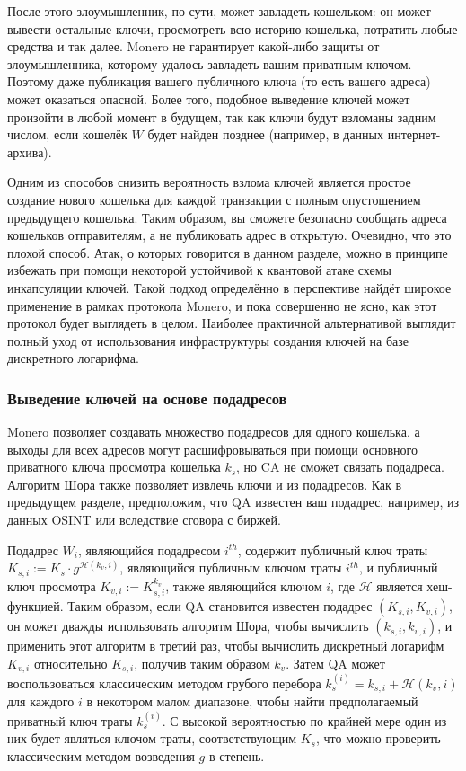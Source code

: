 \documentclass{mrl}
\begin{document}
После этого злоумышленник, по сути, может завладеть кошельком: он может вывести остальные ключи, просмотреть всю историю кошелька, потратить любые средства и так далее. Monero не гарантирует какой-либо защиты от злоумышленника, которому удалось завладеть вашим приватным ключом. Поэтому даже публикация вашего публичного ключа (то есть вашего адреса) может оказаться опасной. Более того, подобное выведение ключей может произойти в любой момент в будущем, так как ключи будут взломаны задним числом, если кошелёк $W$ будет найден позднее (например, в данных интернет-архива).

Одним из способов снизить вероятность взлома ключей является простое создание нового кошелька для каждой транзакции с полным опустошением предыдущего кошелька. Таким образом, вы сможете безопасно сообщать адреса кошельков отправителям, а не публиковать адрес в открытую. Очевидно, что это плохой способ. Атак, о которых говорится в данном разделе, можно в принципе избежать при помощи некоторой устойчивой к квантовой атаке схемы инкапсуляции ключей. Такой подход определённо в перспективе найдёт широкое применение в рамках протокола Monero, и пока совершенно не ясно, как этот протокол будет выглядеть в целом. Наиболее практичной альтернативой выглядит полный уход от использования инфраструктуры создания ключей на базе дискретного логарифма.

\subsubsection{Выведение ключей на основе подадресов}

Monero позволяет создавать множество подадресов для одного кошелька, а выходы для всех адресов могут расшифровываться при помощи основного приватного ключа просмотра кошелька $k_s$, но CA не сможет связать подадреса. Алгоритм Шора также позволяет извлечь ключи и из подадресов. Как в предыдущем разделе, предположим, что QA известен ваш подадрес, например, из данных OSINT или вследствие сговора с биржей.

Подадрес $W_i$, являющийся подадресом $i^{th}$, содержит публичный ключ траты $K_{s,i} := K_s \cdot g^{\mathcal{H}(k_v, i)}$, являющийся публичным ключом траты $i^{th}$, и публичный ключ просмотра $K_{v,i} :=  K_{s, i}^{k_v}$, также являющийся ключом $i$, где $\mathcal{H}$ является хеш-функцией.
Таким образом, если QA становится известен подадрес $(K_{s,i}, K_{v,i})$, он может дважды использовать алгоритм Шора, чтобы вычислить $(k_{s,i}, k_{v,i})$, и применить этот алгоритм в третий раз, чтобы вычислить дискретный логарифм $K_{v,i}$ относительно $K_{s,i}$, получив таким образом $k_v$. Затем QA может воспользоваться классическим методом грубого перебора $k_s^{(i)} = k_{s,i} + \mathcal{H}(k_v, i)$ для каждого $i$ в некотором малом диапазоне, чтобы найти предполагаемый приватный ключ траты $k_s^{(i)}$. С высокой вероятностью по крайней мере один из них будет являться ключом траты, соответствующим $K_s$, что можно проверить классическим методом возведения $g$ в степень.
\end{document}
